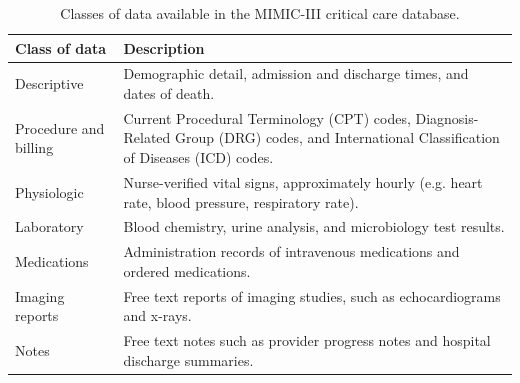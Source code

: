 \documentclass[english]{article}
\begin{document}
\begin{center}
\begin{table}
\begin{tabular}{|l|p{8cm}|}
    \hline
    Class of data & Description \\ 
    \hline
    Descriptive & Demographic detail, admission and discharge times, and dates of death. \\ 
    \hline
    Procedure and billing & Current Procedural Terminology (CPT) codes, Diagnosis-Related Group (DRG) codes, and International Classification of Diseases (ICD) codes. \\ 
    \hline
    Physiologic & Nurse-verified vital signs, approximately hourly (e.g. heart rate, blood pressure, respiratory rate). \\ 
    \hline
    Laboratory & Blood chemistry, urine analysis, and microbiology test results. \\ 
    \hline
    Medications & Administration records of intravenous medications and ordered medications. \\ 
    \hline
    Imaging reports & Free text reports of imaging studies, such as echocardiograms and x-rays. \\ 
    \hline
    Notes & Free text notes such as provider progress notes and hospital discharge summaries. \\ 
    \hline
\end{tabular}
\caption{Classes of data available in the MIMIC-III critical care database.}
\label{table:dataclasses}
\end{table}
\end{center}
\end{document}
